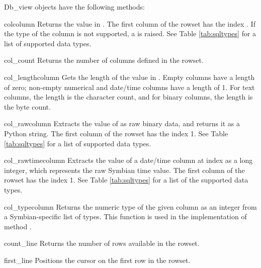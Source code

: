 Db_view objects have the following methods:

\begin{methoddesc}[Db_view]{col}{column}
Returns the value in . The first column of the rowset has the index 
. If the type of the column is not supported, a  is 
raised. See Table \ref{tab:sqltypes} for a list of supported data types.
\end{methoddesc}

\begin{methoddesc}[Db_view]{col_count}{}
Returns the number of columns defined in the rowset.
\end{methoddesc}

\begin{methoddesc}[Db_view]{col_length}{column}
Gets the length of the value in . Empty columns have 
a length of zero; non-empty numerical and date/time columns have a length of 
1. For text columns, the length is the character count, and for binary 
columns, the length is the byte count.
\end{methoddesc}

\begin{methoddesc}[Db_view]{col_raw}{column}
Extracts the value of  as raw binary data, and 
returns it as a Python string. The first column of the rowset has the index 
1. See Table \ref{tab:sqltypes} for a list of supported data types.
\end{methoddesc}

\begin{methoddesc}[Db_view]{col_rawtime}{column}
Extracts the value of a date/time column at index  as a
long integer, which represents the raw Symbian time value. The first
column of the rowset has the index 1.  See Table \ref{tab:sqltypes} for a list of the
supported data types.
\end{methoddesc}

\begin{methoddesc}[Db_view]{col_type}{column}
Returns the numeric type of the given column as an integer from a 
Symbian-specific list of types. This function is used in the implementation 
of method .
\end{methoddesc}

\begin{methoddesc}[Db_view]{count_line}{}
Returns the number of rows available in the rowset.
\end{methoddesc}

\begin{methoddesc}[Db_view]{first_line}{}
Positions the cursor on the first row in the rowset.
\end{methoddesc}

